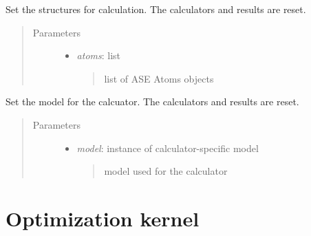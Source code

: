 \documentclass[letterpaper,10pt,english]{sphinxmanual}
\begin{document}
\begin{fulllineitems}
\begin{fulllineitems}
\label{classes:catcalc.CATCalc.set_atoms}
Set the structures for calculation. The calculators
and results are reset.
\begin{quote}\begin{description}
\item[{Parameters}] \leavevmode\begin{itemize}
\item {} 
\emph{atoms}: list
\begin{quote}

list of ASE Atoms objects
\end{quote}

\end{itemize}

\end{description}\end{quote}

\end{fulllineitems}


\begin{fulllineitems}
\label{classes:catcalc.CATCalc.set_model}
Set the model for the calcuator. The calculators
and results are reset.
\begin{quote}\begin{description}
\item[{Parameters}] \leavevmode\begin{itemize}
\item {} 
\emph{model}: instance of calculator-specific model
\begin{quote}

model used for the calculator
\end{quote}

\end{itemize}

\end{description}\end{quote}

\end{fulllineitems}


\end{fulllineitems}



\section{Optimization kernel}
\label{classes:optimization-kernel}\label{classes:module-catkernel}
\end{document}
